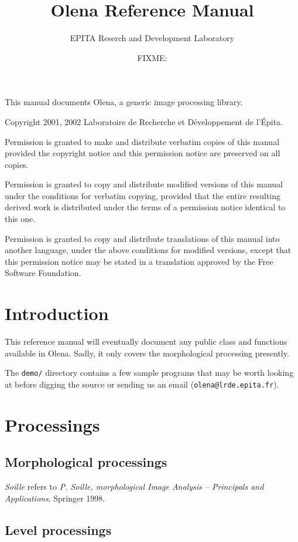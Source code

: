 \documentclass{book}
\newcommand\var\textit
\begin{document}
\title{Olena Reference Manual}
\author{EPITA Reserch and Development Laboratory}
\date{FIXME:}
\maketitle


This manual documents Olena, a generic image processing library.

Copyright 2001, 2002  Laboratoire de Recherche et D\'eveloppement de l'\'Epita.

Permission is granted to make and distribute verbatim
copies of this manual provided the copyright notice and
this permission notice are preserved on all copies.


Permission is granted to copy and distribute modified versions of this
manual under the conditions for verbatim copying, provided that the
entire resulting derived work is distributed under the terms of a
permission notice identical to this one.

Permission is granted to copy and distribute
translations of this manual into another language,
under the above conditions for modified versions,
except that this permission notice may be stated in a
translation approved by the Free Software Foundation.

\newpage

\chapter{Introduction}

This reference manual will eventually document any public class and
functions available in Olena.  Sadly, it only covers the morphological
processing presently.

The \texttt{demo/} directory contains a few sample programs that may be
worth looking at before digging the source or sending us an email
(\texttt{olena@lrde.epita.fr}).


\chapter{Processings}

\section{Morphological processings}

\emph{Soille} refers to \emph{P. Soille, morphological Image Analysis
-- Principals and Applications}.  Springer 1998.



\section{Level processings}


\end{document}
